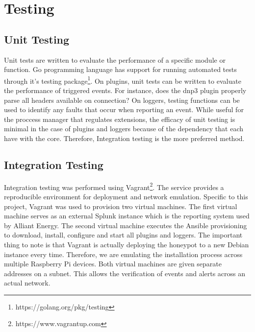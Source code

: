\chapter{Testing}
\section{Unit Testing}

Unit tests are written to evaluate the performance of a specific module or function. Go programming language has support for running automated tests through it's testing package\footnote{https://golang.org/pkg/testing}. On plugins, unit tests can be written to evaluate the performance of triggered events. For instance, does the dnp3 plugin properly parse all headers available on connection? On loggers, testing functions can be used to identify any faults that occur when reporting an event. While useful for the proccess manager that regulates extensions, the efficacy of unit testing is minimal in the case of plugins and loggers because of the dependency that each have with the core. Therefore, Integration testing is the more preferred method. 


\section{Integration Testing}

Integration testing was performed using Vagrant\footnote{https://www.vagrantup.com}. The service provides a reproducible environment for deployment and network emulation. Specific to this project, Vagrant was used to provision two virtual machines. The first virtual machine serves as an external Splunk instance which is the reporting system used by Alliant Energy. The second virtual machine executes the Ansible provisioning to download, install, configure and start all plugins and loggers. The important thing to note is that Vagrant is actually deploying the honeypot to a new Debian instance every time. Therefore, we are emulating the installation process across multiple Raspberry Pi devices. Both virtual machines are given separate addresses on a subnet. This allows the verification of events and alerts across an actual network.
